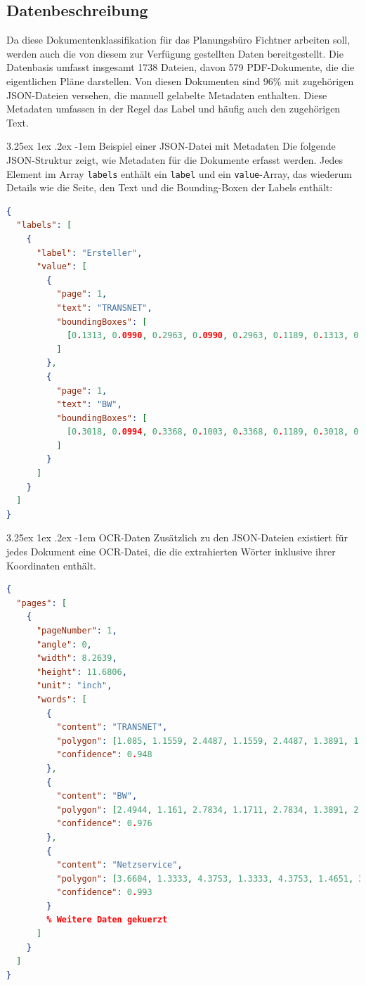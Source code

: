 \documentclass[12pt,a4paper,twoside]{article}
\makeatletter
\renewcommand\paragraph{\@startsection{paragraph}{5}{\z@}%
  {3.25ex \@plus1ex \@minus.2ex}%
  {-1em}%
  {\normalfont\normalsize\bfseries}}
\makeatother
\begin{document}
\subsection{Datenbeschreibung}
Da diese Dokumentenklassifikation für das Planungsbüro Fichtner arbeiten soll, werden auch die von diesem zur Verfügung gestellten Daten bereitgestellt. Die Datenbasis umfasst insgesamt 1738 Dateien, davon 579 PDF-Dokumente, die die eigentlichen Pläne darstellen. Von diesen Dokumenten sind 96\% mit zugehörigen JSON-Dateien versehen, die manuell gelabelte Metadaten enthalten. Diese Metadaten umfassen in der Regel das Label und häufig auch den zugehörigen Text.

\paragraph{Beispiel einer JSON-Datei mit Metadaten}
Die folgende JSON-Struktur zeigt, wie Metadaten für die Dokumente erfasst werden. Jedes Element im Array \texttt{labels} enthält ein \texttt{label} und ein \texttt{value}-Array, das wiederum Details wie die Seite, den Text und die Bounding-Boxen der Labels enthält:
\begin{lstlisting}[language=json,firstnumber=1]
{
  "labels": [
    {
      "label": "Ersteller",
      "value": [
        {
          "page": 1,
          "text": "TRANSNET",
          "boundingBoxes": [
            [0.1313, 0.0990, 0.2963, 0.0990, 0.2963, 0.1189, 0.1313, 0.1189]
          ]
        },
        {
          "page": 1,
          "text": "BW",
          "boundingBoxes": [
            [0.3018, 0.0994, 0.3368, 0.1003, 0.3368, 0.1189, 0.3018, 0.1189]
          ]
        }
      ]
    }
  ]
}
\end{lstlisting}

\paragraph{OCR-Daten}
Zusätzlich zu den JSON-Dateien existiert für jedes Dokument eine OCR-Datei, die die extrahierten Wörter inklusive ihrer Koordinaten enthält.

\begin{lstlisting}[language=json,firstnumber=1]
{
  "pages": [
    {
      "pageNumber": 1,
      "angle": 0,
      "width": 8.2639,
      "height": 11.6806,
      "unit": "inch",
      "words": [
        {
          "content": "TRANSNET",
          "polygon": [1.085, 1.1559, 2.4487, 1.1559, 2.4487, 1.3891, 1.0799, 1.3891],
          "confidence": 0.948
        },
        {
          "content": "BW",
          "polygon": [2.4944, 1.161, 2.7834, 1.1711, 2.7834, 1.3891, 2.4944, 1.3891],
          "confidence": 0.976
        },
        {
          "content": "Netzservice",
          "polygon": [3.6604, 1.3333, 4.3753, 1.3333, 4.3753, 1.4651, 3.6604, 1.4651],
          "confidence": 0.993
        }
        % Weitere Daten gekuerzt
      ]
    }
  ]
}
\end{lstlisting}
\end{document}
